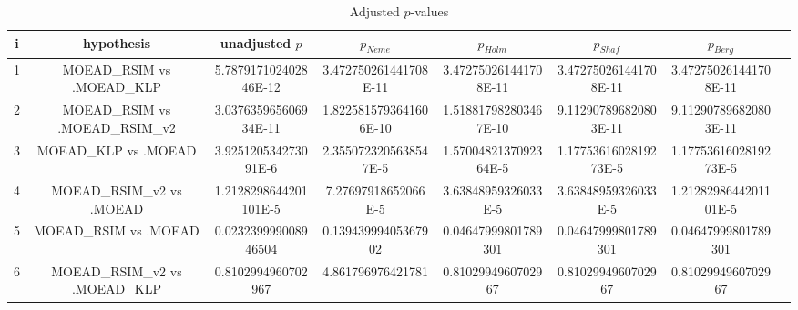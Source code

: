\documentclass[a4paper,10pt]{article}
\begin{document}
\begin{landscape}
\begin{table}[!htp]
\centering\tiny
\caption{Adjusted $p$-values}
\begin{tabular}{cccccccc}
i&hypothesis&unadjusted $p$&$p_{Neme}$&$p_{Holm}$&$p_{Shaf}$&$p_{Berg}$\\
\hline
1&MOEAD_RSIM vs .MOEAD_KLP&5.787917102402846E-12&3.472750261441708E-11&3.472750261441708E-11&3.472750261441708E-11&3.472750261441708E-11\\
2&MOEAD_RSIM vs .MOEAD_RSIM_v2&3.037635965606934E-11&1.8225815793641606E-10&1.518817982803467E-10&9.112907896820803E-11&9.112907896820803E-11\\
3&MOEAD_KLP vs .MOEAD&3.925120534273091E-6&2.3550723205638547E-5&1.5700482137092364E-5&1.1775361602819273E-5&1.1775361602819273E-5\\
4&MOEAD_RSIM_v2 vs .MOEAD&1.2128298644201101E-5&7.27697918652066E-5&3.63848959326033E-5&3.63848959326033E-5&1.2128298644201101E-5\\
5&MOEAD_RSIM vs .MOEAD&0.023239999008946504&0.13943999405367902&0.04647999801789301&0.04647999801789301&0.04647999801789301\\
6&MOEAD_RSIM_v2 vs .MOEAD_KLP&0.8102994960702967&4.861796976421781&0.8102994960702967&0.8102994960702967&0.8102994960702967\\
\hline
\end{tabular}
\end{table}

\end{landscape}
\end{document}
